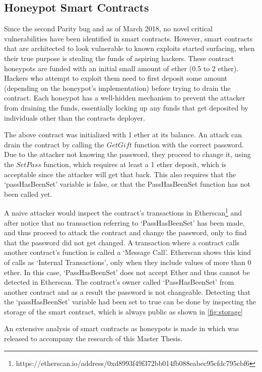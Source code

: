 \subsection{Honeypot Smart Contracts} \label{honeypots}
Since the second Parity bug and as of March 2018, no novel critical vulnerabilities have been identified in smart contracts. However, smart contracts that are architected to look vulnerable to known exploits started surfacing, when their true purpose is stealing the funds of aspiring hackers. These contract honeypots are funded with an initial small amount of ether (0.5 to 2 ether). Hackers who attempt to exploit them need to first deposit some amount (depending on the honeypot's implementation) before trying to drain the contract. Each honeypot has a well-hidden mechanism to prevent the attacker from draining the funds, essentially locking up any funds that get deposited by individuals other than the contracts deployer. 

The above contract was initialized with 1 ether at its balance. An attack can drain the contract by calling the $GetGift$ function with the correct password. Due to the attacker not knowing the password, they proceed to change it, using the $SetPass$ function, which requires at least a 1 ether deposit, which is acceptable since the attacker will get that back. This also requires that the `passHasBeenSet' variable is false, or that the PassHasBeenSet function has not been called yet.

A naive attacker would inspect the contract's transactions in Etherscan\footnote{https://etherscan.io/address/0xd8993f49f372bb014fb088eabec95cfdc795cbf6} and after notice that no transaction referring to `PassHasBeenSet' has been made, and thus proceed to attack the contract and change the password, only to find that the password did not get changed. A transaction where a contract calls another contract's function is called a `Message Call'. Etherscan shows this kind of calls as `Internal Transactions', only when they include values of more than 0 ether. In this case, `PassHasBeenSet' does not accept Ether and thus cannot be detected in Etherscan. The contract's owner called `PassHasBeenSet' from another contract and as a result the password is not changeable. Detecting that the `passHasBeenSet' variable had been set to true can be done by inspecting the storage of the smart contract, which is always public as shown in \ref{fig:storage}

An extensive analysis of smart contracts as honeypots is made in \cite{honeypots} which was released to accompany the research of this Master Thesis.


